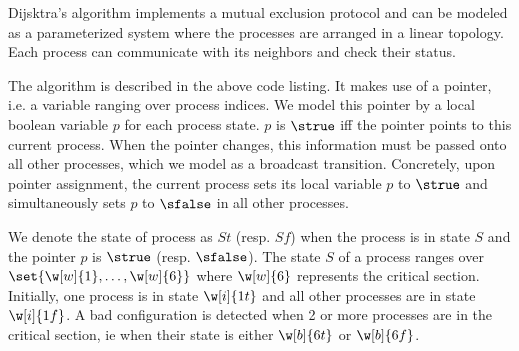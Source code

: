 \label{app:dijkstra}
Dijsktra's algorithm %
implements a mutual exclusion protocol and can be modeled as a
parameterized system where the processes are arranged in a linear
topology. Each process can communicate with its neighbors and check
their status.

\medskip
%
The algorithm is described in the above code listing.
%
It makes use of a pointer, i.e. a variable ranging over
process indices. We model this pointer by a local boolean variable $p$
for each process state.
%
$p$ is $\strue$ iff the pointer points to this current process. When
the pointer changes, this information must be passed onto all other
processes, which we model as a broadcast transition. Concretely, upon
pointer assignment, the current process sets its local variable $p$ to
$\strue$ and simultaneously sets $p$ to $\sfalse$ in all other
processes.

We denote the state of process as $St$ (resp. $Sf$) when the process
is in state $S$ and the pointer $p$ is $\strue$ (resp. $\sfalse$). The
state $S$ of a process ranges over $\set{\w[w]{1},\ldots,\w[w]{6}}$
where $\w[w]{6}$ represents the critical section.
%
Initially, one process is in state $\w[i]{1t}$ and all other processes
are in state $\w[i]{1f}$. A bad configuration is detected when 2 or
more processes are in the critical section, ie when their state is
either $\w[b]{6t}$ or $\w[b]{6f}$.


